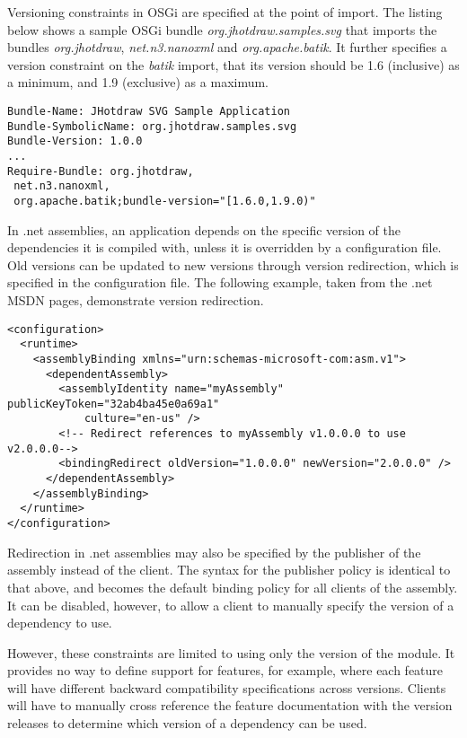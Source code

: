 Versioning constraints in OSGi are specified at the point of import. The
listing below shows a sample OSGi bundle \textit{org.jhotdraw.samples.svg}
that imports the bundles \textit{org.jhotdraw}, \textit{net.n3.nanoxml} and
\textit{org.apache.batik}. It further specifies a version constraint on
the \textit{batik} import, that its version should be 1.6 (inclusive) as
a minimum, and 1.9 (exclusive) as a maximum.

\begin{lstlisting}[caption=OSGi Bundle Version Constraints]
Bundle-Name: JHotdraw SVG Sample Application
Bundle-SymbolicName: org.jhotdraw.samples.svg
Bundle-Version: 1.0.0
...
Require-Bundle: org.jhotdraw,
 net.n3.nanoxml,
 org.apache.batik;bundle-version="[1.6.0,1.9.0)"
\end{lstlisting}

In .net assemblies, an application depends on the specific version of the 
dependencies it is compiled with, unless it is overridden by a configuration
file. Old versions can be updated to new versions through version redirection,
which is specified in the configuration file. The following example, taken
from the .net MSDN pages, demonstrate version redirection.

\begin{lstlisting}[caption=.net Assemblies Version Redirection]
<configuration>
  <runtime>
    <assemblyBinding xmlns="urn:schemas-microsoft-com:asm.v1">
      <dependentAssembly>
        <assemblyIdentity name="myAssembly" publicKeyToken="32ab4ba45e0a69a1" 
        	culture="en-us" />
        <!-- Redirect references to myAssembly v1.0.0.0 to use v2.0.0.0-->
        <bindingRedirect oldVersion="1.0.0.0" newVersion="2.0.0.0" />
      </dependentAssembly>
    </assemblyBinding>
  </runtime>
</configuration>
\end{lstlisting}

Redirection in .net assemblies may also be specified by the publisher of the
assembly instead of the client. The syntax for the publisher policy is identical
to that above, and becomes the default binding policy for all clients of the assembly.
It can be disabled, however, to allow a client to manually specify the version of
a dependency to use.

However, these constraints are limited to using only the version of the module.
It provides no way to define support for features, for example, where each feature 
will have different backward compatibility specifications across versions. 
Clients will have to manually cross reference the feature documentation with the version releases
to determine which version of a dependency can be used.

